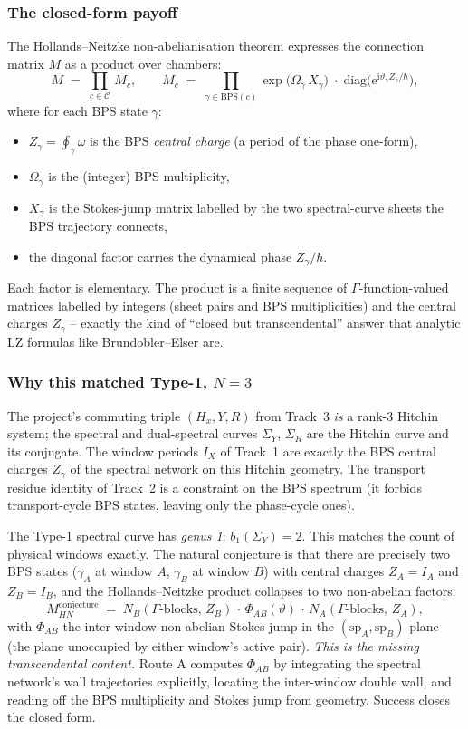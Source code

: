 \documentclass[11pt]{article}
\newcommand{\ii}{\mathrm i}\newcommand{\dd}{\mathrm d}
\begin{document}
\subsubsection*{The closed-form payoff}

The Hollands--Neitzke non-abelianisation theorem expresses the
connection matrix $M$ as a product over chambers:
\[
M \;=\; \prod_{c \in \mathcal C}\, M_c,
\qquad
M_c \;=\; \prod_{\gamma \in \mathrm{BPS}(c)}
        \exp\!\bigl(\Omega_{\gamma}\, X_\gamma\bigr)
        \;\cdot\;
        \mathrm{diag}\bigl(\mathrm e^{\ii\vartheta_\gamma Z_\gamma/\hbar}\bigr),
\]
where for each BPS state $\gamma$:
\begin{itemize}
 \item $Z_\gamma = \oint_\gamma \omega$ is the BPS \emph{central charge}
 (a period of the phase one-form),
 \item $\Omega_\gamma$ is the (integer) BPS multiplicity,
 \item $X_\gamma$ is the Stokes-jump matrix labelled by the two
 spectral-curve sheets the BPS trajectory connects,
 \item the diagonal factor carries the dynamical phase
 $Z_\gamma/\hbar$.
\end{itemize}
Each factor is elementary. The product is a finite sequence of
$\Gamma$-function-valued matrices labelled by integers
(sheet pairs and BPS multiplicities) and the central charges $Z_\gamma$
-- exactly the kind of ``closed but transcendental'' answer that
analytic LZ formulas like Brundobler--Elser are.

\subsubsection*{Why this matched Type-1, $N=3$}

The project's commuting triple $(H_x,Y,R)$ from Track~3 \emph{is} a
rank-3 Hitchin system; the spectral and dual-spectral curves
$\Sigma_Y$, $\Sigma_R$ are the Hitchin curve and its conjugate. The
window periods $I_X$ of Track~1 are exactly the BPS central charges
$Z_\gamma$ of the spectral network on this Hitchin geometry. The
transport residue identity of Track~2 is a constraint on the BPS
spectrum (it forbids transport-cycle BPS states, leaving only the
phase-cycle ones).

The Type-1 spectral curve has \emph{genus 1}: $b_1(\Sigma_Y)=2$. This
matches the count of physical windows exactly. The natural conjecture
is that there are precisely two BPS states ($\gamma_A$ at window $A$,
$\gamma_B$ at window $B$) with central charges $Z_A=I_A$ and $Z_B=I_B$,
and the Hollands--Neitzke product collapses to two non-abelian factors:
\[
M_{HN}^{\text{conjecture}}
\;=\;
N_B(\Gamma\text{-blocks},\, Z_B)\,\cdot\,
\Phi_{AB}(\vartheta)\,\cdot\,
N_A(\Gamma\text{-blocks},\, Z_A),
\]
with $\Phi_{AB}$ the inter-window non-abelian Stokes jump in the
$(\mathrm{sp}_A,\mathrm{sp}_B)$ plane (the plane unoccupied by either
window's active pair). \emph{This is the missing transcendental
content.} Route A computes $\Phi_{AB}$ by integrating the spectral
network's wall trajectories explicitly, locating the inter-window
double wall, and reading off the BPS multiplicity and Stokes jump from
geometry. Success closes the closed form.
\end{document}
